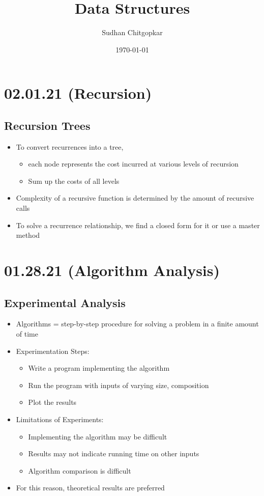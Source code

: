 \documentclass[11pt]{article}
\author{Sudhan Chitgopkar}
\date{\today}
\title{Data Structures}
\begin{document}
\maketitle
\section*{02.01.21 (Recursion)}
\label{sec:orgf5d0979}
\subsection*{Recursion Trees}
\label{sec:org87a10ef}
\begin{itemize}
\item To convert recurrences into a tree,
\begin{itemize}
\item each node represents the cost incurred at various levels of recursion
\item Sum up the costs of all levels
\end{itemize}
\item Complexity of a recursive function is determined by the amount of recursive calls
\item To solve a recurrence relationship, we find a closed form for it or use a master method
\end{itemize}
\section*{01.28.21 (Algorithm Analysis)}
\label{sec:orga033551}
\subsection*{Experimental Analysis}
\label{sec:orgacfb8fe}
\begin{itemize}
\item Algorithms = step-by-step procedure for solving a problem in a finite amount of time
\item Experimentation Steps:
\begin{itemize}
\item Write a program implementing the algorithm
\item Run the program with inputs of varying size, composition
\item Plot the results
\end{itemize}
\item Limitations of Experiments:
\begin{itemize}
\item Implementing the algorithm may be difficult
\item Results may not indicate running time on other inputs
\item Algorithm comparison is difficult
\end{itemize}
\item For this reason, theoretical results are preferred
\end{itemize}
\end{document}
